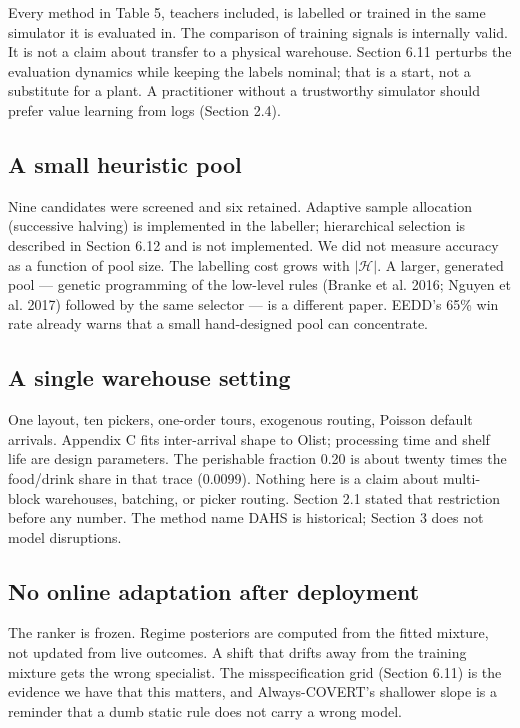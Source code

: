 \documentclass[review,3p,times]{elsarticle}
\theoremstyle{definition}
\begin{document}
Every method in Table 5, teachers included, is labelled or trained in
the same simulator it is evaluated in. The comparison of training
signals is internally valid. It is not a claim about transfer to a
physical warehouse. Section 6.11 perturbs the evaluation dynamics while
keeping the labels nominal; that is a start, not a substitute for a
plant. A practitioner without a trustworthy simulator should prefer
value learning from logs (Section 2.4).

\subsection{A small heuristic pool}\label{a-small-heuristic-pool}

Nine candidates were screened and six retained. Adaptive sample
allocation (successive halving) is implemented in the labeller;
hierarchical selection is described in Section 6.12 and is not
implemented. We did not measure accuracy as a function of pool size. The
labelling cost grows with \(|\mathcal{H}|\). A larger, generated pool
--- genetic programming of the low-level rules (Branke et al. 2016;
Nguyen et al. 2017) followed by the same selector --- is a different
paper. EEDD's 65\% win rate already warns that a small hand-designed
pool can concentrate.

\subsection{A single warehouse
setting}\label{a-single-warehouse-setting}

One layout, ten pickers, one-order tours, exogenous routing, Poisson
default arrivals. Appendix C fits inter-arrival shape to Olist;
processing time and shelf life are design parameters. The perishable
fraction 0.20 is about twenty times the food/drink share in that trace
(0.0099). Nothing here is a claim about multi-block warehouses,
batching, or picker routing. Section 2.1 stated that restriction before
any number. The method name DAHS is historical; Section 3 does not model
disruptions.

\subsection{No online adaptation after
deployment}\label{no-online-adaptation-after-deployment}

The ranker is frozen. Regime posteriors are computed from the fitted
mixture, not updated from live outcomes. A shift that drifts away from
the training mixture gets the wrong specialist. The misspecification
grid (Section 6.11) is the evidence we have that this matters, and
Always-COVERT's shallower slope is a reminder that a dumb static rule
does not carry a wrong model.
\end{document}
